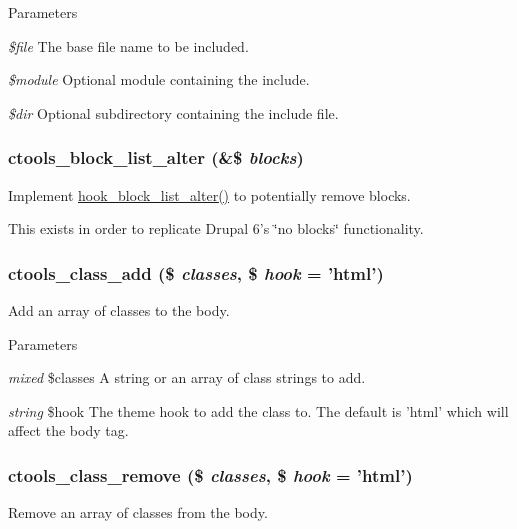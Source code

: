 \begin{DoxyParams}{Parameters}
\item[{\em \$file}]The base file name to be included. \item[{\em \$module}]Optional module containing the include. \item[{\em \$dir}]Optional subdirectory containing the include file. \end{DoxyParams}
\hypertarget{ctools_8module_a75e6c439d7246bcab69763c612716c90}{
\subsubsection[{ctools\_\-block\_\-list\_\-alter}]{\setlength{\rightskip}{0pt plus 5cm}ctools\_\-block\_\-list\_\-alter (\&\$ {\em blocks})}}
\label{ctools_8module_a75e6c439d7246bcab69763c612716c90}
Implement \hyperlink{group__hooks_gaf38c7633b52b18831e3ec0459d8e9f41}{hook\_\-block\_\-list\_\-alter()} to potentially remove blocks.

This exists in order to replicate Drupal 6's \char`\"{}no blocks\char`\"{} functionality. \hypertarget{ctools_8module_ab5cc2ffd960a4d73767401993abbfaa4}{
\subsubsection[{ctools\_\-class\_\-add}]{\setlength{\rightskip}{0pt plus 5cm}ctools\_\-class\_\-add (\$ {\em classes}, \/  \$ {\em hook} = {\ttfamily 'html'})}}
\label{ctools_8module_ab5cc2ffd960a4d73767401993abbfaa4}
Add an array of classes to the body.


\begin{DoxyParams}{Parameters}
\item[{\em mixed}]\$classes A string or an array of class strings to add. \item[{\em string}]\$hook The theme hook to add the class to. The default is 'html' which will affect the body tag. \end{DoxyParams}
\hypertarget{ctools_8module_a3f5486d5ce6afc374f0131aa7a71387a}{
\subsubsection[{ctools\_\-class\_\-remove}]{\setlength{\rightskip}{0pt plus 5cm}ctools\_\-class\_\-remove (\$ {\em classes}, \/  \$ {\em hook} = {\ttfamily 'html'})}}
\label{ctools_8module_a3f5486d5ce6afc374f0131aa7a71387a}
Remove an array of classes from the body.


